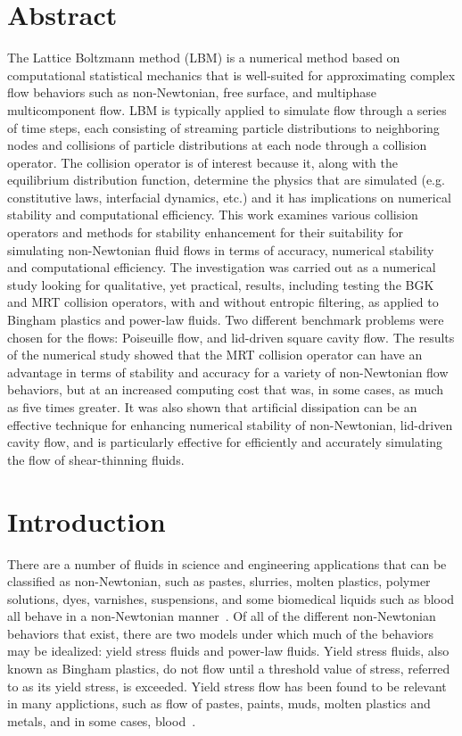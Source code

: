 \section*{Abstract}

The Lattice Boltzmann method (LBM) is a numerical method based on computational statistical mechanics that is well-suited for approximating complex flow behaviors such as non-Newtonian, free surface, and multiphase multicomponent flow.
LBM is typically applied to simulate flow through a series of time steps, each consisting of streaming particle distributions to neighboring nodes and collisions of particle distributions at each node through a collision operator.
The collision operator is of interest because it, along with the equilibrium distribution function, determine the physics that are simulated (e.g. constitutive laws, interfacial dynamics, etc.) and it has implications on numerical stability and computational efficiency.
This work examines various collision operators and methods for stability enhancement for their suitability for simulating non-Newtonian fluid flows in terms of accuracy, numerical stability and computational efficiency.
The investigation was carried out as a numerical study looking for qualitative, yet practical, results, including testing the BGK and MRT collision operators, with and without entropic filtering, as applied to Bingham plastics and power-law fluids.
Two different benchmark problems were chosen for the flows: Poiseuille flow, and lid-driven square cavity flow.
The results of the numerical study showed that the MRT collision operator can have an advantage in terms of stability and accuracy for a variety of non-Newtonian flow behaviors, but at an increased computing cost that was, in some cases, as much as five times greater.
It was also shown that artificial dissipation can be an effective technique for enhancing numerical stability of non-Newtonian, lid-driven cavity flow, and is particularly effective for efficiently and accurately simulating the flow of shear-thinning fluids.

\section{Introduction} %

There are a number of fluids in science and engineering applications that can be classified as non-Newtonian, such as pastes, slurries, molten plastics, polymer solutions, dyes, varnishes, suspensions, and some biomedical liquids such as blood all behave in a non-Newtonian manner~\cite{bohme1987non}.
Of all of the different non-Newtonian behaviors that exist, there are two models under which much of the behaviors may be idealized: yield stress fluids and power-law fluids.
Yield stress fluids, also known as Bingham plastics, do not flow until a threshold value of stress, referred to as its yield stress, is exceeded.
Yield stress flow has been found to be relevant in many applictions, such as flow of pastes, paints, muds, molten plastics and metals, and in some cases, blood~\cite{wang2011lattice}. %

